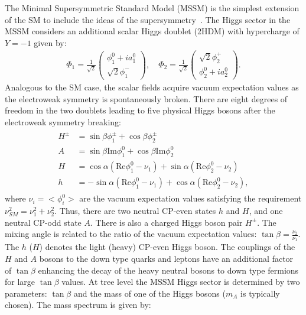 The Minimal Supersymmetric Standard Model (MSSM) is the simplest extension of the SM to include the ideas of the supersymmetry~\cite{Fayet:1974pd,Fayet:1977yc}. The Higgs sector in the MSSM considers an additional scalar Higgs doublet (2HDM) with hypercharge of $Y=-1$ given by:
\begin{eqnarray} \label{eq:2hdm}
\Phi_1  = \frac{1}{\sqrt{2}}\left(\begin{array}{c} \phi^{0}_1+ia_1^0 \\ \sqrt{2}\phi^{-}_1 \end{array} \right), \quad \Phi_2  = \frac{1}{\sqrt{2}}\left(\begin{array}{c} \sqrt{2}\phi^{+}_2 \\ \phi^{0}_2+ia_2^0 \end{array} \right).
\end{eqnarray}    
Analogous to the SM case, the scalar fields acquire vacuum expectation values as the electroweak symmetry is spontaneously broken. There are eight degrees of freedom in the two doublets leading to five physical Higgs bosons after the electroweak symmetry breaking:
\begin{eqnarray} \label{eq:mssm_higgs}
\begin{aligned}
H^{\pm} &= \sin \beta \phi_1^{\pm} + \cos \beta \phi_2^{\pm} \\
A  &= \sin \beta \mathrm{Im}\phi_1^{0} + \cos \beta \mathrm{Im}\phi_2^{0} \\
H  &= \cos \alpha(\mathrm{Re}\phi_1^{0}-\nu_1) + \sin \alpha (\mathrm{Re}\phi_2^{0}-\nu_2) \\
h  &= -\sin \alpha(\mathrm{Re}\phi_1^{0}-\nu_1) + \cos \alpha (\mathrm{Re}\phi_2^{0}-\nu_2),
\end{aligned}
\end{eqnarray}   
where $\nu_i=<\phi_i^0>$ are the vacuum expectation values satisfying the requirement $\nu_{SM}^2 = \nu_1^2 + \nu_2^2$. Thus, there are two neutral CP-even states $h$ and $H$, and one neutral CP-odd state $A$. There is also a charged Higgs boson pair $H^{\pm}$. The mixing angle is related to the ratio of the vacuum expectation values: $\tan \beta = \frac{\nu_2}{\nu_1}$. The $h$ ($H$) denotes the light (heavy) CP-even Higgs boson. The couplings of the $H$ and $A$ bosons to the down type quarks and leptons have an additional factor of $\tan \beta$ enhancing the decay of the heavy neutral bosons to down type fermions for large $\tan \beta$ values. At tree level the MSSM Higgs sector is determined by two parameters: $\tan \beta$ and the mass of one of the Higgs bosons ($m_{A}$ is typically chosen). The mass spectrum is given by:

